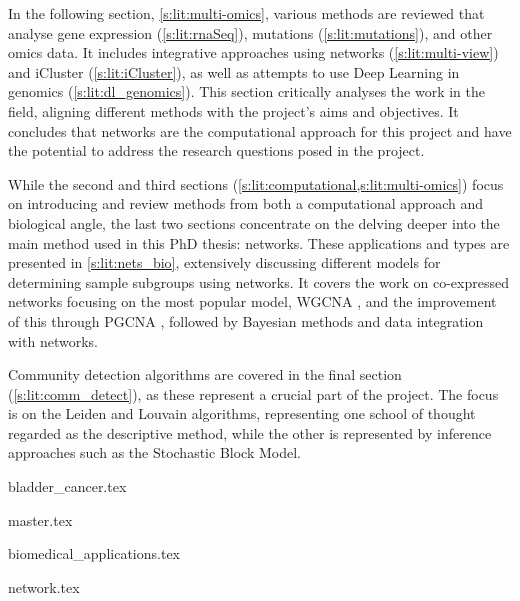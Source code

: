 In the following section, \ref{s:lit:multi-omics}, various methods are reviewed that analyse gene expression (\cref{s:lit:rnaSeq}), mutations (\cref{s:lit:mutations}), and other omics data. It includes integrative approaches using networks (\cref{s:lit:multi-view}) and iCluster (\cref{s:lit:iCluster}), as well as attempts to use Deep Learning in genomics (\cref{s:lit:dl_genomics}). This section critically analyses the work in the field, aligning different methods with the project's aims and objectives. It concludes that networks are the computational approach for this project and have the potential to address the research questions posed in the project.

While the second and third sections  (\cref{s:lit:computational,s:lit:multi-omics}) focus on introducing and review methods from both a computational approach and biological angle, the last two sections concentrate on the delving deeper into the main method used in this PhD thesis: networks. These applications and types are presented in \cref{s:lit:nets_bio}, extensively discussing different models for determining sample subgroups using networks. It covers the work on co-expressed networks focusing on the most popular model, WGCNA \citep{Langfelder2008-sn}, and the improvement of this through PGCNA \citep{Care2019-ij}, followed by Bayesian methods and data integration with networks.

Community detection algorithms are covered in the final section (\cref{s:lit:comm_detect}), as these represent a crucial part of the project. The focus is on the Leiden and Louvain algorithms, representing one school of thought regarded as the descriptive method, while the other is represented by inference approaches such as the Stochastic Block Model.



{bladder_cancer.tex}

\pagebreak

{master.tex}

\newpage

{biomedical_applications.tex}


\pagebreak

{network.tex}



